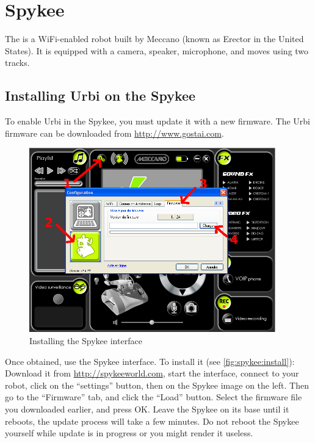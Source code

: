 
\chapter{Spykee}
\label{sec:spykee}

The  is a WiFi-enabled robot built by Meccano (known as
Erector in the United States). It is equipped with a camera, speaker,
microphone, and moves using two tracks.

\section{Installing Urbi on the Spykee}

To enable Urbi in the Spykee, you must update it with a new firmware. The Urbi
firmware can be downloaded from \url{http://www.gostai.com}.

\begin{figure}[htp]
  \centering
  \includegraphics[width=0.95\textwidth]{img/spykee-flash-instructions}
  \caption{Installing the Spykee interface}
  \label{fig:spykee:install}
\end{figure}

Once obtained, use the Spykee interface.  To install it (see
\autoref{fig:spykee:install}): Download it from
\url{http://spykeeworld.com}, start the interface, connect to your robot,
click on the ``settings'' button, then on the Spykee image on the left.
Then go to the ``Firmware'' tab, and click the ``Load'' button. Select the
firmware file you downloaded earlier, and press OK. Leave the Spykee on its
base until it reboots, the update process will take a few minutes. Do not
reboot the Spykee yourself while update is in progress or you might render
it useless.

